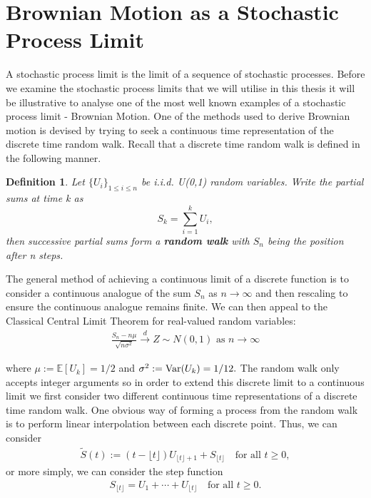 \documentclass[honours,12pt]{unswthesis}
\newcommand{\E}{\mathbb{E}}
\newcommand{\1}{\mathbf 1}
\newcommand{\Var}{\mathop{\rm Var}}
\newtheorem{definition}[equation]{Definition}
\numberwithin{equation}{section}
\theoremstyle{definition}
\theoremstyle{remark}
\begin{document}
\section{Brownian Motion as a Stochastic Process Limit}\label{s:background}
A stochastic process limit is the limit of a sequence of stochastic processes. Before we examine the stochastic process limits that we will utilise in this thesis it will be illustrative to analyse one of the most well known examples of a stochastic process limit - Brownian Motion. One of the methods used to derive Brownian motion is devised by trying to seek a continuous time representation of the discrete time random walk. Recall that a discrete time random walk is defined in the following manner.\\
\begin{definition}
Let $\{U_i\}_{1\leq i \leq n}$ be i.i.d. U(0,1) random variables. Write the partial sums at time k as
\[
	S_k=\sum_{i=1}^k U_i,
\]
then successive partial sums form a \textbf{random walk} with $S_n$ being the position after n steps.
\\
\end{definition}
\noindent The general method of achieving a continuous limit of a discrete function is to consider a continuous analogue of the sum $S_n$ as $n\to\infty$ and then rescaling to ensure the continuous analogue remains finite. We can then appeal to the Classical Central Limit Theorem for real-valued random variables: %
\begin{align}\label{eq:clt}
\frac{S_n-n\mu}{\sqrt{n\sigma^2}}\overset{d}{\longrightarrow}Z\sim N(0,1)\textrm{ as $n\to\infty$}
\end{align}

\noindent where $\mu:=\E[U_k]=1/2$ and $\sigma^2:=\Var(U_k)=1/12.$
The random walk only accepts integer arguments so in order to extend this discrete limit to a continuous limit we first consider two different continuous time representations of a discrete time random walk. One obvious way of forming a process from the random walk is to perform linear interpolation between each discrete point. Thus, we can consider
\begin{align}
	\tilde{S}(t):=(t-\lfloor t \rfloor)U_{\lfloor t \rfloor +1} + S_{\lfloor t \rfloor}\quad\textrm{for all } t\geq0,
\end{align}
or more simply, we can consider the step function
\begin{align}\label{fun:step}
	S_{\lfloor t \rfloor}=U_1+\cdots+U_{\lfloor t \rfloor}  \quad\textrm{for all } t\geq0.
\end{align}
\end{document}
